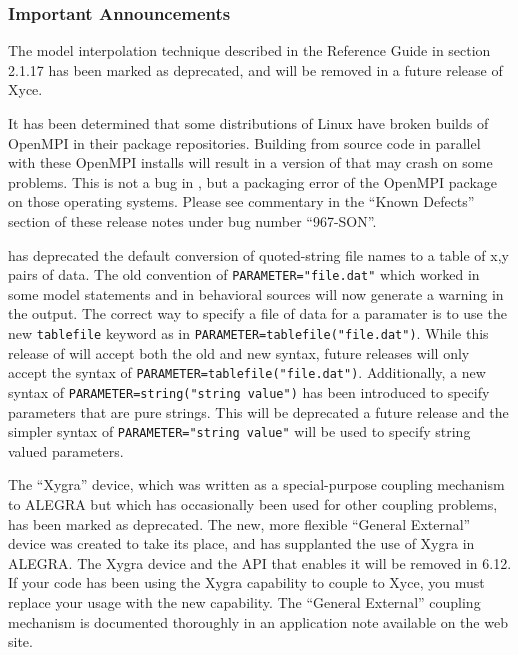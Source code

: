 \documentclass[letterpaper]{scrartcl}
\begin{document}
\subsubsection*{Important Announcements}
\begin{XyceItemize}
\item The model interpolation technique described in the \Xyce{}
  Reference Guide in section 2.1.17 has been marked as deprecated, and
  will be removed in a future release of Xyce.
\item It has been determined that some distributions of Linux have
  broken builds of OpenMPI in their package repositories.  Building
  \Xyce{} from source code in parallel with these OpenMPI installs
  will result in a version of \Xyce{} that may crash on some problems.
  This is not a bug in \Xyce{}, but a packaging error of the OpenMPI
  package on those operating systems.  Please see commentary in the
  ``Known Defects'' section of these release notes under bug number
  ``967-SON''.
\item \Xyce{} has deprecated the default conversion of quoted-string file
  names to a table of x,y pairs of data.  The old convention of
  \texttt{PARAMETER="file.dat"} which worked in some model statements
  and in behavioral sources will now generate a warning in the \Xyce{}
  output.  The correct way to specify a file of data for a paramater
  is to use the new \texttt{tablefile} keyword as in
  \texttt{PARAMETER=tablefile("file.dat")}.  While this release of
  \Xyce{} will accept both the old and new syntax, future releases
  will only accept the syntax of
  \texttt{PARAMETER=tablefile("file.dat")}.  Additionally, a new
  syntax of \texttt{PARAMETER=string("string value")} has been
  introduced to specify parameters that are pure strings.  This will
  be deprecated a future release and the simpler syntax of
  \texttt{PARAMETER="string value"} will be used to specify string
  valued parameters.
\item The ``Xygra'' device, which was written as a special-purpose
  coupling mechanism to ALEGRA but which has occasionally been used
  for other coupling problems, has been marked as deprecated.  The
  new, more flexible ``General External'' device was created to take
  its place, and has supplanted the use of Xygra in ALEGRA.  The Xygra
  device and the API that enables it will be removed in \Xyce{} 6.12.
  If your code has been using the Xygra capability to couple to Xyce,
  you must replace your usage with the new capability.  The ``General
  External'' coupling mechanism is documented thoroughly in an
  application note available on the \Xyce{} web site.
\end{XyceItemize}
\end{document}
